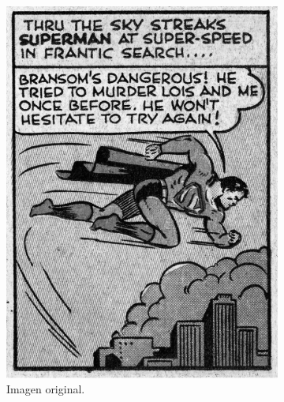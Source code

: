 \documentclass[11pt,twocolumn,twoside]{opticajnl}
\begin{document}
\begin{figure}[h]
    \centering
         \begin{subfigure}[h]{0.49\linewidth}
            \centering
            \includegraphics[width=\textwidth]{Figuras/superman.png}
            \caption{Imagen original.} 
         \end{subfigure}
         \begin{subfigure}[h]{0.49\linewidth}
            \centering

\end{subfigure}
\end{figure}
\end{document}
